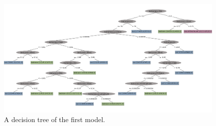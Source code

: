 	
	\begin{figure}[h]
		\label{fig:classtree}	
		\centering
		\includegraphics[scale=0.40, angle=90]{tree/edited.png}
		\caption{A decision tree of the first model.}
	\end{figure}

